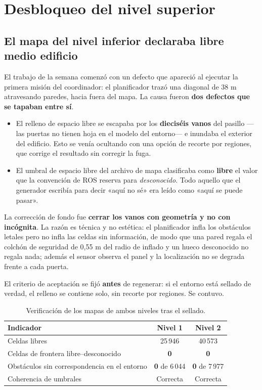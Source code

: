 \documentclass[12pt,letterpaper]{article}
\begin{document}
\section{Desbloqueo del nivel superior}
\label{sec:piso2}

\subsection{El mapa del nivel inferior declaraba libre medio edificio}

El trabajo de la semana comenzó con un defecto que apareció al ejecutar la primera misión del coordinador: el planificador trazó una diagonal de 38 m atravesando paredes, hacia fuera del mapa. La causa fueron \textbf{dos defectos que se tapaban entre sí}.

\begin{itemize}
    \item El relleno de espacio libre se escapaba por los \textbf{dieciséis vanos} del pasillo ---las puertas no tienen hoja en el modelo del entorno--- e inundaba el exterior del edificio. Esto se venía ocultando con una opción de recorte por regiones, que corrige el resultado sin corregir la fuga.
    \item El umbral de espacio libre del archivo de mapa clasificaba como \textbf{libre} el valor que la convención de ROS reserva para \emph{desconocido}. Todo aquello que el generador escribía para decir «aquí no sé» era leído como «aquí se puede pasar».
\end{itemize}

La corrección de fondo fue \textbf{cerrar los vanos con geometría y no con incógnita}. La razón es técnica y no estética: el planificador infla los obstáculos letales pero no infla las celdas sin información, de modo que una pared regala el colchón de seguridad de 0,55 m del radio de inflado y un hueco desconocido no regala nada; además el sensor observa el panel y la localización no se degrada frente a cada puerta.

El criterio de aceptación se fijó \textbf{antes} de regenerar: si el entorno está sellado de verdad, el relleno se contiene solo, sin recorte por regiones. Se contuvo.

\begin{table}[H]
    \centering
    \small
    \caption{Verificación de los mapas de ambos niveles tras el sellado.}
    \label{tab:mapas}
    \begin{tabular}{@{}lcc@{}}
        \toprule
        \textbf{Indicador} & \textbf{Nivel 1} & \textbf{Nivel 2} \\ \midrule
        Celdas libres              & 25\,946 & 40\,573 \\
        Celdas de frontera libre--desconocido & \textbf{0} & \textbf{0} \\
        Obstáculos sin correspondencia en el entorno & \textbf{0} de 6\,044 & \textbf{0} de 7\,977 \\
        Coherencia de umbrales     & Correcta & Correcta \\ \bottomrule
    \end{tabular}
\end{table}
\end{document}
